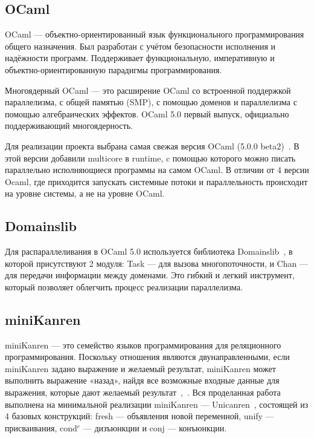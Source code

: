 \subsection{OCaml} OCaml --- объектно-ориентированный язык
функционального программирования общего назначения.
Был разработан с учётом безопасности исполнения и надёжности 
программ. Поддерживает функциональную, императивную
и объектно-ориентированную парадигмы программирования. 

Многоядерный OCaml --- это расширение OCaml со
встроенной поддержкой параллелизма, с
общей памятью (SMP), с помощью доменов и
параллелизма с помощью алгебраических эффектов. 
OCaml 5.0 первый 
выпуск, официально поддерживающий многоядерность.

Для реализации проекта выбрана самая свежая версия OCaml (5.0.0 beta2)~\cite{ocaml}.
В этой версии добавили multicore в runtime, c помощью которого можно
писать параллельно исполняющиеся программы на самом OCaml. В отличии от 4 версии
Ocaml, где приходится запускать системные потоки и параллельность происходит на уровне системы, 
а не на уровне OCaml.

\subsection{Domainslib} Для распараллеливания в OCaml 5.0 
используется библиотека Domainslib~\cite{domainslib}, в 
которой присутствуют 2 модуля: Task --- для вызова
многопоточности, и Chan --- для передачи информации между
доменами. Это гибкий и легкий инструмент, который позволяет 
облегчить процесс реализации параллелизма.

\subsection{miniKanren} miniKanren --- это семейство 
языков программирования для реляционного программирования. 
Поскольку отношения являются двунаправленными, если miniKanren 
задано выражение и желаемый результат, miniKanren может выполнить 
выражение «назад», найдя все возможные входные данные для 
выражения, которые дают желаемый результат~\cite{miniKanren},~\cite{berd}.
Вся проделанная работа выполнена на минимальной реализации
miniKanren --- Unicanren~\cite{unicanren}, состоящей из 4 базовых конструкций:
fresh --- объявления новой переменной, unify --- присваивания, cond$^e$ --- дизъюнкции и conj --- конъюнкции.
